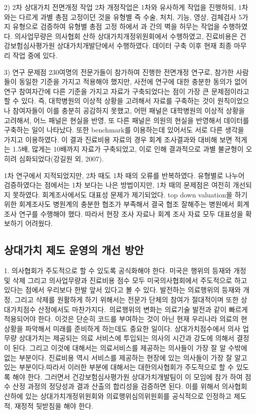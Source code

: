 2) 2차 상대가치 전면개정 작업 2차 개정작업은 1차와 유사하게 작업을 진행하되, 1차와는 다르게 과별 총점 고정이던 것을 유형별 즉 수술, 처치, 기능, 영상, 검체검사 5가지 유형으로 검증하여 유형별 총점 고정 하에서 과 간의 벽을 허무는 작업을 수행하였다. 의사업무량은 의사협회 산하 상대가치개정위원회에서 수행하였고, 진료비용은 건강보험심사평가원 상대가치개발단에서 수행하였다. 데이터 구축 이후 현재 최종 마무리 작업 중에 있다.

3) 연구 문제점 230여명의 전문가들이 참가하여 진행한 전면개정 연구로, 참가한 사람들이 동일한 기준을 가지고 적용해야 했지만, 사전에 연구에 대한 충분한 동의가 없어 연구 참여자간에 다른 기준을 가지고 자료가 구축되었다는 점이 가장 큰 문제점이라고 할 수 있다. 즉, 대학병원의 이상적 상황을 고려해서 자료를 구축하는 것이 원칙이었으나 참여자들이 이를 충분히 공감하지 못했고, 어떤 패널은 대학병원의 이상적 상황을 고려해서, 어느 패널은 현실을 반영, 또 다른 패널은 의원의 현실을 반영해서 데이터를 구축하는 일이 나타났다. 또한 benchmark를 이용하는데 있어서도 서로 다른 생각을 가지고 이용하였다. 이 결과 진료비용 자료의 경우 회계 조사결과와 대비해 보면 적게는 1.5배, 많게는 10배까지 자료가 구축되었고, 이로 인해 결과적으로 과별 불균형이 오히려 심화되었다(강길원 외, 2007).


 1차 연구에서 지적되었지만, 2차 때도 1차 때의 오류를 반복하였다. 유형별로 나누어 검증하였다는 점에서는 1차 보다는 나은 방법이지만, 1차 때의 문제점은 여전히 개선되지 못하였다. 회계조사에서도 대표성 문제가 제기되었다. top down valuation을 하기 위한 회계조사도 병원계의 충분한 협조가 부족해서 결국 협조 잘해주는 병원에서 회계조사 연구를 수행해야 했다. 따라서 현장 조사 자료나 회계 조사 자료 모두 대표성을 확보하기 어려웠다. 

\subsection{상대가치 제도 운영의 개선 방안}
1. 의사협회가 주도적으로 할 수 있도록 공식화해야 한다.
미국은 행위의 등재와 개정 및 삭제 그리고 의사업무량과 진료비용 점수 모두 미국의사협회에서 주도적으로 하고 있다는 점에서 우리보다 한발 앞서 있다고 볼 수 있다. 발전하는 의료행위의 등재와 개정, 그리고 삭제를 원활하게 하기 위해서는 전문가 단체의 참여가 절대적이며 또한 상대가치점수 산정에서도 마찬가지다. 의료행위의 변화는 의료기술 발전과 같이 빠르게 적용되어야 한다. 이것은 단순히 코드를 부여하는 것이 아닌 현재 우리나라 의료의 현 상황을 파악해서 미래를 준비하게 하는데도 중요한 일이다. 상대가치점수에서 의사 업무량 상대가치는 제공되는 의료 서비스에 투입되는 의사의 시간과 강도에 의해서 결정이 된다. 그리고 이것에 대해서는 의료서비스를 제공하는 의사들이 가장 잘 알 수밖에 없는 부분이다. 진료비용 역시 서비스를 제공하는 현장에 있는 의사들이 가장 잘 알고 있는 부분이다.따라서 이러한 부분에 대해서는 대한의사협회가 주도적으로 할 수 있도록 해야 한다. 그러면서 건강보험심사평가원 상대가치개발팀이 이 모임에 참가 하여 점수 산정 과정의 정당성과 결과 산출의 합리성을 검증하면 된다. 이를 위해서 의사협회 산하에 있는 상대가치개정위원회와 의료행위심의위원회를 공식적으로 인정하고 제도적, 재정적 뒷받침을 해야 한다.

